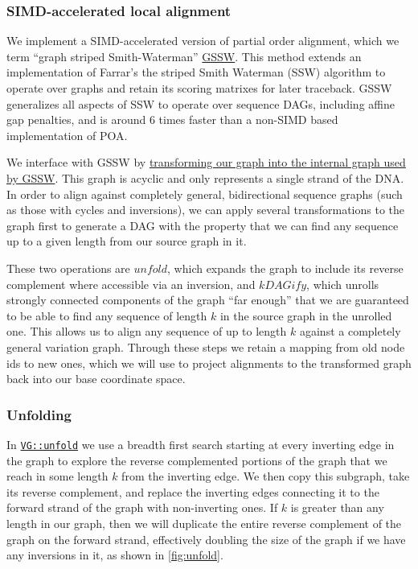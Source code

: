 \documentclass{article}
\begin{document}
\subsubsection{SIMD-accelerated local alignment}

We implement a SIMD-accelerated version of partial order alignment, which we term ``graph striped Smith-Waterman'' \href{https://github.com/ekg/gssw}{GSSW}.
This method extends an implementation \cite{zhao2013} of Farrar's the striped Smith Waterman (SSW) algorithm \cite{farrar2007} to operate over graphs and retain its scoring matrixes for later traceback.
GSSW generalizes all aspects of SSW to operate over sequence DAGs, including affine gap penalties, and is around 6 times faster than a non-SIMD based implementation of POA.

We interface with GSSW by \href{https://github.com/vgteam/vg/blob/fbcb6e62/src/vg.cpp#L6461-L6532}{transforming our graph into the internal graph used by GSSW}.
This graph is acyclic and only represents a single strand of the DNA.
In order to align against completely general, bidirectional sequence graphs (such as those with cycles and inversions), we can apply several transformations to the graph first to generate a DAG with the property that we can find any sequence up to a given length from our source graph in it.

These two operations are $unfold$, which expands the graph to include its reverse complement where accessible via an inversion, and $kDAGify$, which unrolls strongly connected components of the graph ``far enough'' that we are guaranteed to be able to find any sequence of length $k$ in the source graph in the unrolled one.
This allows us to align any sequence of up to length $k$ against a completely general variation graph.
Through these steps we retain a mapping from old node ids to new ones, which we will use to project alignments to the transformed graph back into our base coordinate space.

\subsubsection{Unfolding}

In \href{https://github.com/vgteam/vg/blob/fbcb6e62/src/vg.cpp#L8289-L8400}{{\tt VG::unfold}} we use a breadth first search starting at every inverting edge in the graph to explore the reverse complemented portions of the graph that we reach in some length $k$ from the inverting edge.
We then copy this subgraph, take its reverse complement, and replace the inverting edges connecting it to the forward strand of the graph with non-inverting ones.
If $k$ is greater than any length in our graph, then we will duplicate the entire reverse complement of the graph on the forward strand, effectively doubling the size of the graph if we have any inversions in it, as shown in \ref{fig:unfold}.
\end{document}
